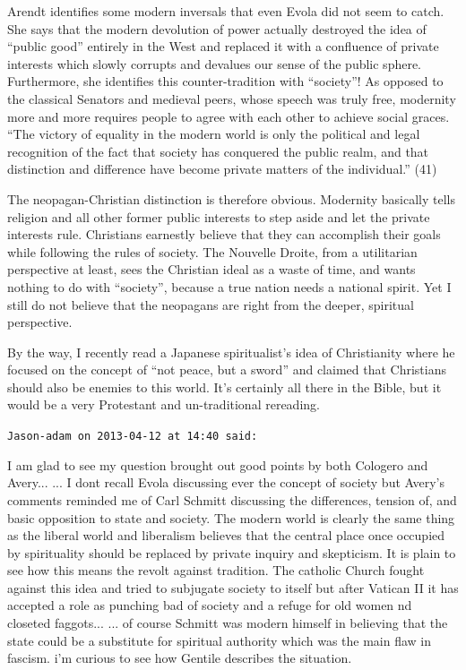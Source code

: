 \begin{footnotesize}
\begin{sffamily}
Arendt identifies some modern inversals that even Evola did not seem to catch. She says that the modern devolution of power actually destroyed the idea of ``public good'' entirely in the West and replaced it with a confluence of private interests which slowly corrupts and devalues our sense of the public sphere. Furthermore, she identifies this counter-tradition with ``society''! As opposed to the classical Senators and medieval peers, whose speech was truly free, modernity more and more requires people to agree with each other to achieve social graces. ``The victory of equality in the modern world is only the political and legal recognition of the fact that society has conquered the public realm, and that distinction and difference have become private matters of the individual.'' (41)

The neopagan-Christian distinction is therefore obvious. Modernity basically tells religion and all other former public interests to step aside and let the private interests rule. Christians earnestly believe that they can accomplish their goals while following the rules of society. The Nouvelle Droite, from a utilitarian perspective at least, sees the Christian ideal as a waste of time, and wants nothing to do with ``society'', because a true nation needs a national spirit. Yet I still do not believe that the neopagans are right from the deeper, spiritual perspective.

By the way, I recently read a Japanese spiritualist's idea of Christianity where he focused on the concept of ``not peace, but a sword'' and claimed that Christians should also be enemies to this world. It's certainly all there in the Bible, but it would be a very Protestant and un-traditional rereading.

\hfill

\texttt{Jason-adam on 2013-04-12 at 14:40 said:}

I am glad to see my question brought out good points by both Cologero and Avery... ... I dont recall Evola discussing ever the concept of society but Avery's comments reminded me of Carl Schmitt discussing the differences, tension of, and basic opposition to state and society. The modern world is clearly the same thing as the liberal world and liberalism believes that the central place once occupied by spirituality should be replaced by private inquiry and skepticism. It is plain to see how this means the revolt against tradition. The catholic Church fought against this idea and tried to subjugate society to itself but after Vatican II it has accepted a role as punching bad of society and a refuge for old women nd closeted faggots... ... of course Schmitt was modern himself in believing that the state could be a substitute for spiritual authority which was the main flaw in fascism. i'm curious to see how Gentile describes the situation.


\end{sffamily}
\end{footnotesize}
